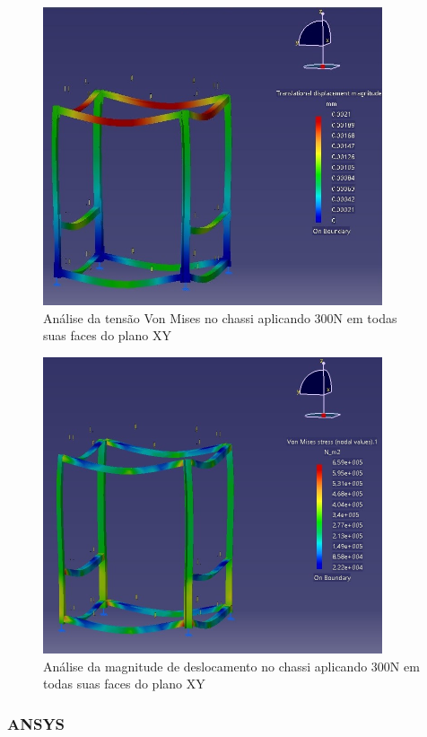 \begin{figure}[H]
	\centering
	\includegraphics[width=10cm]{figuras/catia7.jpg}
	\caption{Análise da tensão Von Mises no chassi aplicando 300N em todas suas faces do plano XY}
	\label{fig:catia7}
\end{figure}
\begin{figure}[H]
	\centering
	\includegraphics[width=10cm]{figuras/catia8.jpg}
	\caption{Análise da magnitude de deslocamento no chassi aplicando 300N em todas suas faces do plano XY}
	\label{fig:catia8}
\end{figure}
\subsubsection{ANSYS}

